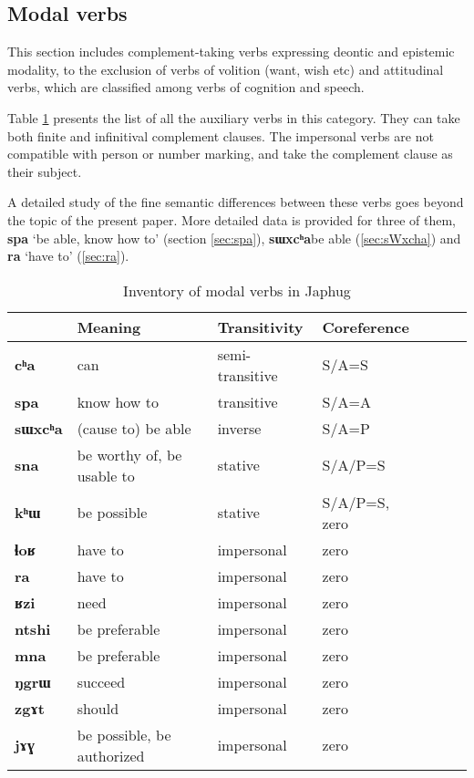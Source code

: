 \documentclass[oneside,a4paper,11pt]{article}
\newcommand{\ipa}[1]{\textbf{\phon#1}} %
\newcommand{\jpg}[2]{\ipa{#1} `#2'} %
\begin{document}
  \subsection{Modal verbs}
This section includes complement-taking verbs expressing deontic and epistemic modality, to the exclusion of verbs of volition (want, wish etc) and attitudinal verbs, which are classified among verbs of cognition and speech.

Table \ref{tab:modal.verbs} presents the list of all the auxiliary verbs in this category. They can take both finite and infinitival complement clauses. The impersonal verbs are not compatible with person or number marking, and take the complement clause as their subject. 

A detailed study of the fine semantic differences between these verbs goes beyond the topic of the present paper. More detailed data is provided for three of them, \jpg{spa}{be able, know how to} (section \ref{sec:spa}), \ipa{sɯxcʰa}{be able} (\ref{sec:sWxcha}) and \jpg{ra}{have to} (\ref{sec:ra}).

\begin{table}[H]
\caption{Inventory of modal verbs in Japhug} \centering \label{tab:modal.verbs}
\begin{tabular}{lllllll}
\toprule
 & 	Meaning & 	Transitivity & 	Coreference & 	\\
 \midrule
\ipa{cʰa} & 	can & 	semi-transitive & 	S/A=S & 	\\
\ipa{spa} & 	know how to & 	transitive & 	S/A=A & 	\\
\ipa{sɯxcʰa} & 	(cause to) be able & 	inverse & 	S/A=P & 	\\
\ipa{sna} & 	be worthy of, be usable to & 	stative & 	S/A/P=S & 	\\
\ipa{kʰɯ} & 	be possible & 	stative & 	S/A/P=S, zero & 	\\
\midrule
\ipa{ɬoʁ} & 	have to & 	impersonal & 	zero & 	\\
\ipa{ra} & 	have to & 	impersonal & 	zero & 	\\
\ipa{ʁzi} & 	need & 	impersonal & 	zero & 	\\
\ipa{ntshi} & 	be preferable & 	impersonal & 	zero & 	\\
\ipa{mna} & 	be preferable & 	impersonal & 	zero & 	\\
\ipa{ŋgrɯ} & 	succeed & 	impersonal & 	zero & 	\\
\ipa{zgɤt} & 	should & 	impersonal & 	zero & 	\\
\ipa{jɤɣ} & 	be possible, be authorized & 	impersonal & 	zero & 	\\
\bottomrule
\end{tabular}
\end{table}
\end{document}
